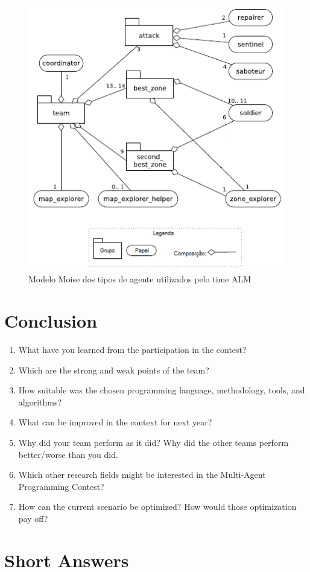 \documentclass{llncs}
\begin{document}
\begin{figure}[!h]
\centering
\includegraphics[width=0.7\linewidth]{./Img/fig2.png}
\caption{Modelo Moise dos tipos de agente utilizados pelo time ALM}
\label{fig:fig2}
\end{figure}


\section{Conclusion}
\begin{enumerate}
\item What have you learned from the participation in the contest?
\item Which are the strong and weak points of the team?
\item How suitable was the chosen programming language, methodology,
  tools, and algorithms?
\item What can be improved in the context for next year?
\item Why did your team perform as it did? Why did the other teams perform better/worse than you did.
\item Which other research fields might be interested in the Multi-Agent Programming Contest?
\item How can the current scenario be optimized? How would those optimization pay off?
\end{enumerate}

\newpage
\section*{Short Answers}
\end{document}
